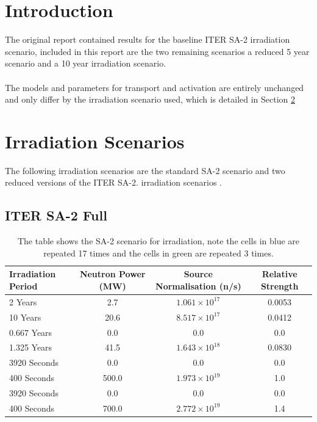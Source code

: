 \documentclass[12pt]{article}
\renewcommand{\listoffigures}{\begingroup
\tocsection
\tocfile{\listfigurename}{lof}
\endgroup}
\renewcommand{\listoftables}{\begingroup
\tocsection
\tocfile{\listtablename}{lot}
\endgroup}
\begin{document}
\maketitle
\newpage
\tableofcontents
\newpage
\listoffigures
\newpage
\listoftables
\newpage
\section{Introduction}
The original report \cite{iter_sdr_report} contained results for the baseline
ITER SA-2 irradiation scenario, included in this report are the two remaining
scenarios a reduced 5 year scenario and a 10 year irradiation scenario. 
\\
\\
The models and parameters for transport and activation are entirely unchanged 
and only differ by the irradiation scenario used, which is detailed in Section
\ref{sec:irradiation_scenario}
\newpage
\section{Irradiation Scenarios}
\label{sec:irradiation_scenario}
The following irradiation scenarios are the standard SA-2 scenario and 
two reduced versions of the ITER SA-2.
irradiation scenarios \cite{sa2_irradiation}. 
\subsection{ITER SA-2 Full}
\begin{table}[ht!]
   \begin{tabular}{| l | c | c | c |}
      \hline 
      Irradiation Period & Neutron Power (MW) & Source Normalisation (n/s) &  Relative Strength \\
      \hline
      2 Years & 2.7 & $1.061\times10^{17}$ & 0.0053 \\
      10 Years & 20.6 & $8.517\times10^{17}$ & 0.0412 \\
      0.667 Years & 0.0 & 0.0 & 0.0 \\
      1.325 Years & 41.5 & $1.643\times10^{18}$ & 0.0830 \\
      \cellcolor{blue!25} 3920 Seconds & \cellcolor{blue!25} 0.0 & \cellcolor{blue!25} 0.0 & \cellcolor{blue!25} 0.0 \\
      \cellcolor{blue!25} \cellcolor{blue!25} 400 Seconds & \cellcolor{blue!25} 500.0 & \cellcolor{blue!25} $1.973\times10^{19}$ & \cellcolor{blue!25} 1.0  \\
      \cellcolor{green!25} 3920 Seconds & \cellcolor{green!25} 0.0 & \cellcolor{green!25} 0.0 &\cellcolor{green!25} 0.0 \\
      \cellcolor{green!25} 400 Seconds & \cellcolor{green!25} 700.0 & \cellcolor{green!25} $2.772\times10^{19}$ &\cellcolor{green!25} 1.4 \\
      \hline
\end{tabular}
\caption{The table shows the SA-2 scenario for irradiation, note the
         cells in \textcolor{blue!25}{blue} are repeated 17 times
         and the cells in \textcolor{green!25}{green} are repeated 3
         times.}
\label{tab:irrad_scenario}
\end{table}
\end{document}
